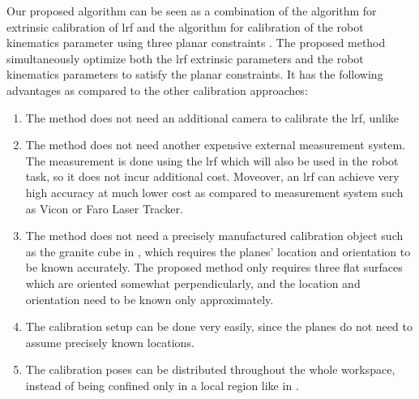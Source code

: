 Our proposed algorithm can be seen as a combination of the algorithm for extrinsic calibration of \ac{lrf} \cite{Zhang2004} and the algorithm for calibration of the robot kinematics parameter using three planar constraints \cite{Joubair2015}. The proposed method simultaneously optimize both the \ac{lrf} extrinsic parameters and the robot kinematics parameters to satisfy the planar constraints. It has the following advantages as compared to the other calibration approaches:
\begin{enumerate}
\item The method does not need an additional camera to calibrate the \ac{lrf}, unlike \cite{Zhang2004}
\item The method does not need another expensive external measurement system. The measurement is done using the \ac{lrf} which will also be used in the robot task, so it does not incur additional cost. Moveover, an \ac{lrf} can achieve very high accuracy at much lower cost as compared to measurement system such as Vicon or Faro Laser Tracker. 
\item The method does not need a precisely manufactured calibration object such as the granite cube in \cite{Joubair2015}, which requires the planes' location and orientation to be known accurately. The proposed method only requires
three flat surfaces which are oriented somewhat perpendicularly, and the location and orientation need to be known only approximately. 
\item The calibration setup can be done very easily, since the planes do not need to assume precisely known locations.  
\item The calibration poses can be distributed throughout the whole workspace, instead of being confined only in a local region like in \cite{Joubair2015}. 
\end{enumerate}



